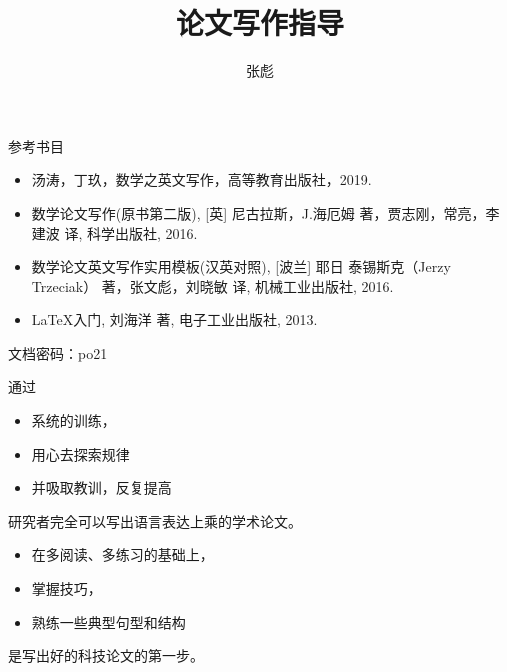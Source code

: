\documentclass[13pt,fontset=mac]{ctexbeamer}
\begin{document}
\title[]{论文写作指导}
\author[]{{\large 张彪} }

\date{}


%



\begin{frame}
\maketitle
\end{frame}



\begin{frame}{参考书目}

	\begin{itemize}
	\item 汤涛，丁玖，数学之英文写作，高等教育出版社，2019. 

	\item  数学论文写作(原书第二版), [英] 尼古拉斯，J.海厄姆 著，贾志刚，常亮，李建波 译, 科学出版社, 2016. 

	\item \alert{数学论文英文写作实用模板(汉英对照)}, [波兰] 耶日 泰锡斯克（Jerzy Trzeciak） 著，张文彪，刘晓敏 译, 机械工业出版社, 2016. 

	\item LaTeX入门, 刘海洋 著, 电子工业出版社, 2013.
	\end{itemize}

	文档密码：po21
\end{frame}

\begin{frame}
	通过
		\begin{itemize}
		\item  系统的训练，
		\item 用心去探索\alert{规律}
		\item 并吸取教训，反复提高
	\end{itemize}
研究者完全可以写出语言表达上乘的学术论文。


\vspace{15pt}

\begin{itemize}
	\item 在多阅读、多练习的基础上，
	\item 掌握\alert{技巧}，
	\item 熟练一些\alert{典型句型}和\alert{结构}
\end{itemize}
是写出好的科技论文的第一步。
\end{frame}
\end{document}
